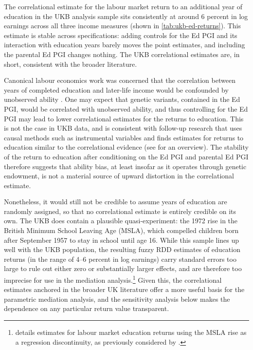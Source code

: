 The correlational estimate for the labour market return to an additional year of education in the UKB analysis sample sits consistently at around 6 percent in log earnings across all three income measures (shown in \autoref{tab:ukb-ed-returns}).
This estimate is stable across specifications: adding controls for the Ed PGI and its interaction with education years barely moves the point estimates, and including the parental Ed PGI changes nothing.
The UKB correlational estimates are, in short, consistent with the broader literature.

Canonical labour economics work was concerned that the correlation between years of completed education and later-life income would be confounded by unobserved ability \citep{griliches1977}.
One may expect that genetic variants, contained in the Ed PGI, would be correlated with unobserved ability, and thus controlling for the Ed PGI may lead to lower correlational estimates for the returns to education.
This is not the case in UKB data, and is consistent with follow-up research that uses causal methods such as instrumental variables and finds estimates for returns to education similar to the correlational evidence (see \citealt{card1999causal} for an overview).
The stability of the return to education after conditioning on the Ed PGI and parental Ed PGI therefore suggests that ability bias, at least insofar as it operates through genetic endowment, is not a material source of upward distortion in the correlational estimate.

Nonetheless, it would still not be credible to assume years of education are randomly assigned, so that no correlational estimate is entirely credible on its own.
The UKB does contain a plausible quasi-experiment: the 1972 rise in the British Minimum School Leaving Age (MSLA), which compelled children born after September 1957 to stay in school until age 16.
While this sample lines up well with the UKB population, the resulting fuzzy RDD estimates of education returns (in the range of 4--6 percent in log earnings) carry standard errors too large to rule out either zero or substantially larger effects, and are therefore too imprecise for use in the mediation analysis.\footnote{
     details estimates for labour market education returns using the MSLA rise as a regression discontinuity, as previously considered by \cite{barcellos2021effect}.
}
Given this, the correlational estimates anchored in the broader UK literature offer a more useful basis for the parametric mediation analysis, and the sensitivity analysis below makes the dependence on any particular return value transparent.

